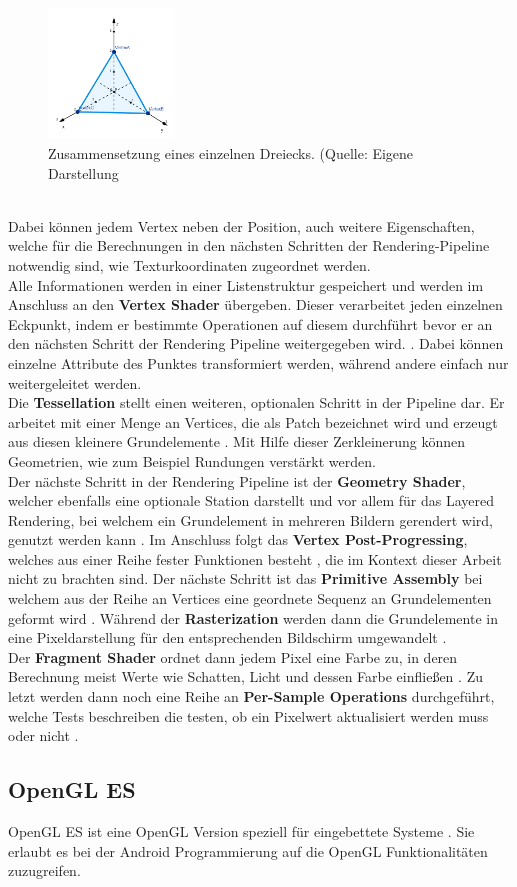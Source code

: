 \begin{figure}[h!]
\centering
\includegraphics[width=0.3\textwidth]{Abbildungen/triangle.png}
\caption[OpenGL Triangle]{Zusammensetzung eines einzelnen Dreiecks. (Quelle: Eigene Darstellung}
\label{fig:opengl-trangle}
\end{figure}\\
Dabei können jedem Vertex neben der Position, auch weitere Eigenschaften, welche für die Berechnungen in den nächsten Schritten der Rendering-Pipeline notwendig sind, wie Texturkoordinaten zugeordnet werden. \\
Alle Informationen werden in einer Listenstruktur gespeichert und werden im Anschluss an den \textbf{Vertex Shader} übergeben.
Dieser verarbeitet jeden einzelnen Eckpunkt, indem er bestimmte Operationen auf diesem durchführt bevor er an den nächsten Schritt der Rendering Pipeline weitergegeben wird. \citep{vries:learn-opengl-triangle}. Dabei können einzelne Attribute des Punktes transformiert werden, während andere einfach nur weitergeleitet werden.\\
Die \textbf{Tessellation} stellt einen weiteren, optionalen Schritt in der Pipeline dar. Er arbeitet mit einer Menge an Vertices, die als Patch bezeichnet wird und erzeugt aus diesen kleinere Grundelemente \citep{khronos:tessellation}. Mit Hilfe dieser Zerkleinerung können Geometrien, wie zum Beispiel Rundungen verstärkt werden.\\
Der nächste Schritt in der Rendering Pipeline ist der \textbf{Geometry Shader}, welcher ebenfalls eine optionale Station darstellt und vor allem für das Layered Rendering, bei welchem ein Grundelement in mehreren Bildern gerendert wird, genutzt werden kann \citep{khronos:geometry-shader}. 
Im Anschluss folgt das \textbf{Vertex Post-Progressing}, welches aus einer Reihe fester Funktionen besteht \citep{khronos:rendering-pipeline}, die im Kontext dieser Arbeit nicht zu brachten sind.
Der nächste Schritt ist das \textbf{Primitive Assembly} bei welchem aus der Reihe an Vertices eine geordnete Sequenz an Grundelementen geformt wird \citep{khronos:rendering-pipeline}. 
Während der \textbf{Rasterization} werden dann die Grundelemente in eine Pixeldarstellung für den entsprechenden Bildschirm umgewandelt \citep{vries:learn-opengl-triangle}.\\
Der \textbf{Fragment Shader} ordnet dann jedem Pixel eine Farbe zu, in deren Berechnung meist Werte wie Schatten, Licht und dessen Farbe einfließen \citep{vries:learn-opengl-triangle}.
Zu letzt werden dann noch eine Reihe an \textbf{Per-Sample Operations} durchgeführt, welche Tests beschreiben die testen, ob ein Pixelwert aktualisiert werden muss oder nicht \citep{khronos:rendering-pipeline}.

\subsection{OpenGL ES}
OpenGL ES ist eine OpenGL Version speziell für eingebettete Systeme \citep{android:opengl}. Sie erlaubt es bei der Android Programmierung auf die OpenGL Funktionalitäten zuzugreifen.




